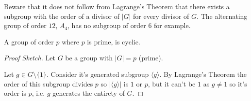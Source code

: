 Beware that it does not follow from Lagrange's Theorem that there 
exists a subgroup with the order of a divisor of $|G|$ for every 
divisor of $G$. The alternating group of order $12$, $A_{4}$, 
has no subgroup of order $6$ for example.

\begin{prop}
    A group of order $p$ where $p$ is prime, is cyclic. 
\end{prop}
\begin{proof}[Proof Sketch]
    Let $G$ be a group with $|G| = p$ (prime). 

    Let $g \in G \setminus \{1\}$. Consider it's generated subgroup 
    $\langle g \rangle$. By Lagrange's Theorem the order of this 
    subgroup divides $p$ so $|\langle g \rangle|$ is $1$ or $p$, but 
    it can't be $1$ as $g \neq 1$ so it's order is $p$, i.e. 
    $g$ generates the entirety of $G$. 
\end{proof}

